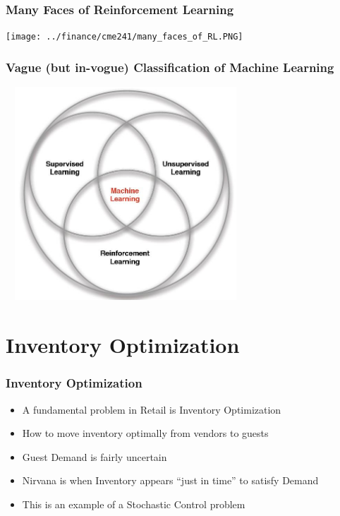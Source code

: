 \documentclass[handout]{beamer}
\begin{document}
\begin{frame}
\frametitle{Many Faces of Reinforcement Learning}
\texttt{[image: ../finance/cme241/many\_faces\_of\_RL.PNG]}
\end{frame}

\begin{frame}
\frametitle{Vague (but in-vogue) Classification of Machine Learning}
\includegraphics[width=9cm, height=8cm]{../finance/cme241/MLBranches.PNG}
\end{frame}


\section{Inventory Optimization}

\begin{frame}
\frametitle{Inventory Optimization}
\pause
\begin{itemize}[<+->]
\item A fundamental problem in Retail is Inventory Optimization
\item How to move inventory optimally from vendors to guests
\item Guest Demand is fairly uncertain
\item Nirvana is when Inventory appears ``just in time'' to satisfy Demand
\item This is an example of a Stochastic Control problem
\end{itemize}
\end{frame}
\end{document}
